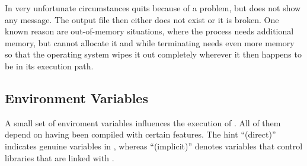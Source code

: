 In very unfortunate circumstances \App{} quits because of a problem, but does not show any
message.  The output file then either does not exist or it is broken.  One known reason are
out-of-memory situations, where the process needs additional memory, but cannot allocate it and
while terminating needs even more memory so that the operating system wipes it out completely
wherever it then happens to be in its execution path.


\subsection[Environment Variables]{\label{sec:environment-variables}%
  Environment Variables}

A small set of enviroment variables influences the execution of \appcmd.  All of them depend on
\appcmd{} having been compiled with certain features.  The hint ``(direct)'' indicates genuine
variables in \appcmd, whereas ``(implicit)'' denotes variables that control libraries that are
linked with \appcmd.

